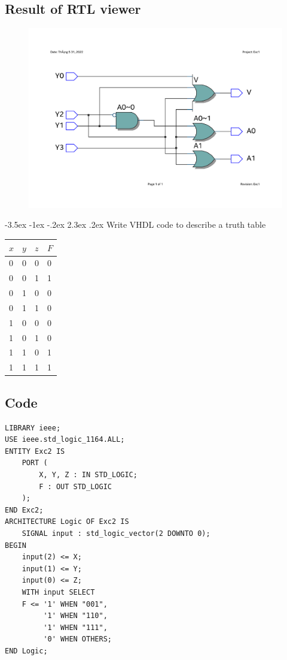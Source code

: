 \documentclass[13pt,a4paper]{report}
\makeatletter
\renewcommand\section{\@startsection {section}{1}{-1em}%
  {-3.5ex \@plus -1ex \@minus -.2ex}%
  {2.3ex \@plus.2ex}%
  {\normalfont\Large\bfseries}}
\makeatother
\begin{document}
\subsection{Result of RTL viewer}
\begin{figure}[H]
\centering
\includegraphics[scale=0.5, clip, trim={2cm 4cm 2cm 5cm}]{images/Exc1_RTL.pdf}
\end{figure}

\section{Write VHDL code to describe a truth table}

\begin{table}[H]
\centering
\begin{tabular}{lll|l}
$x$ & $y$ & $z$ & $F$ \\ \hline
0   & 0   & 0   & 0   \\
0   & 0   & 1   & 1   \\
0   & 1   & 0   & 0   \\
0   & 1   & 1   & 0   \\
1   & 0   & 0   & 0   \\
1   & 0   & 1   & 0   \\
1   & 1   & 0   & 1   \\
1   & 1   & 1   & 1  
\end{tabular}
\end{table}

\subsection{Code}
\begin{verbatim}
LIBRARY ieee;
USE ieee.std_logic_1164.ALL;
ENTITY Exc2 IS
	PORT (
		X, Y, Z : IN STD_LOGIC;
		F : OUT STD_LOGIC
	);
END Exc2;
ARCHITECTURE Logic OF Exc2 IS
	SIGNAL input : std_logic_vector(2 DOWNTO 0);
BEGIN
	input(2) <= X;
	input(1) <= Y;
	input(0) <= Z;
	WITH input SELECT
	F <= '1' WHEN "001", 
	     '1' WHEN "110", 
	     '1' WHEN "111", 
	     '0' WHEN OTHERS;
END Logic;
\end{verbatim}
\end{document}
